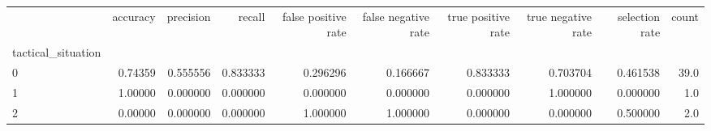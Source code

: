 \begin{tabular}{lrrrrrrrrr}
\toprule
{} &  accuracy &  precision &    recall &  false positive rate &  false negative rate &  true positive rate &  true negative rate &  selection rate &  count \\
tactical\_situation &           &            &           &                      &                      &                     &                     &                 &        \\
\midrule
0                  &   0.74359 &   0.555556 &  0.833333 &             0.296296 &             0.166667 &            0.833333 &            0.703704 &        0.461538 &   39.0 \\
1                  &   1.00000 &   0.000000 &  0.000000 &             0.000000 &             0.000000 &            0.000000 &            1.000000 &        0.000000 &    1.0 \\
2                  &   0.00000 &   0.000000 &  0.000000 &             1.000000 &             1.000000 &            0.000000 &            0.000000 &        0.500000 &    2.0 \\
\bottomrule
\end{tabular}
